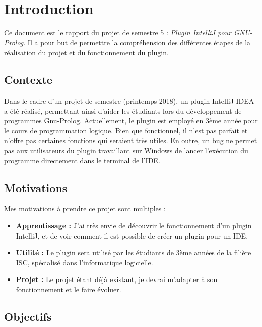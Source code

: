 
\chapter{Introduction}
\noindent
Ce document est le rapport du projet de semestre 5 : \textit{Plugin IntelliJ pour GNU-Prolog}.
Il a pour but de permettre la compréhension des différentes étapes de la réalisation du projet et du fonctionnement du plugin.

\section{Contexte}
\noindent
Dans le cadre d’un projet de semestre (printemps 2018), un plugin IntelliJ-IDEA a été réalisé, permettant ainsi d’aider les étudiants lors du développement de programmes Gnu-Prolog.
Actuellement, le plugin est employé en 3ème année pour le cours de programmation logique.
Bien que fonctionnel, il n’est pas parfait et n’offre pas certaines fonctions qui seraient très utiles. En outre, un bug
ne permet pas aux utilisateurs du plugin travaillant sur Windows de lancer l’exécution du programme directement dans le terminal de l’IDE.

\section{Motivations}
\noindent
Mes motivations à prendre ce projet sont multiples :
\begin{itemize}
    \item \textbf{Apprentissage :} J'ai très envie de découvrir le fonctionnement d'un plugin IntelliJ, et de voir comment il est possible de créer un plugin pour un IDE.
    \item \textbf{Utilité :} Le plugin sera utilisé par les étudiants de 3ème années de la filière ISC, spécialisé dans l'informatique logicielle.
    \item \textbf{Projet :} Le projet étant déjà existant, je devrai m'adapter à son fonctionnement et le faire évoluer.
\end{itemize}

\section{Objectifs}

